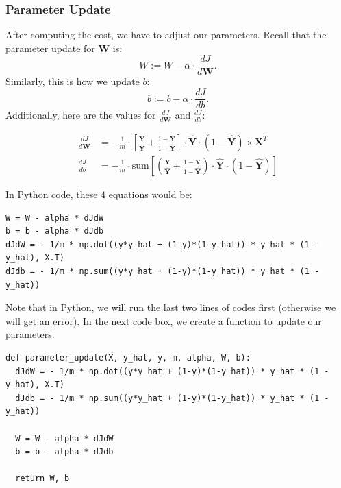 \documentclass{article}
\begin{document}
\subsubsection{Parameter Update}
After computing the cost, we have to adjust our parameters. Recall that the parameter update for $\textbf{W}$ is:
$$W:=W-\alpha\cdot \frac{dJ}{d\textbf{W}}.$$
Similarly, this is how we update $b$:
$$b:=b-\alpha\cdot \frac{dJ}{db}.$$
Additionally, here are the values for $\frac{dJ}{d\textbf{W}}$ and $\frac{dJ}{db}$:

\begin{align*}
\frac{dJ}{d\textbf{W}}&=-\frac{1}{m}\cdot \left[\frac{\textbf{Y}}{\hat{\textbf{Y}}}+\frac{1-\textbf{Y}}{1-\hat{\textbf{Y}}}\right]\cdot \hat{\textbf{Y}}\cdot (1-\hat{\textbf{Y}})\times \textbf{X}^T\\
\frac{dJ}{db}&=-\frac{1}{m}\cdot \text{sum}\left[\left(\frac{\textbf{Y}}{\hat{\textbf{Y}}}+\frac{1-\textbf{Y}}{1-\hat{\textbf{Y}}}\right)\cdot \hat{\textbf{Y}}\cdot (1-\hat{\textbf{Y}})\right]
\end{align*}

In Python code, these 4 equations would be:
\begin{lstlisting}
W = W - alpha * dJdW
b = b - alpha * dJdb
dJdW = - 1/m * np.dot((y*y_hat + (1-y)*(1-y_hat)) * y_hat * (1 - y_hat), X.T)
dJdb = - 1/m * np.sum((y*y_hat + (1-y)*(1-y_hat)) * y_hat * (1 - y_hat))
\end{lstlisting}
Note that in Python, we will run the last two lines of codes first (otherwise we will get an error). In the next code box, we create a function to update our parameters. 

\begin{lstlisting}
def parameter_update(X, y_hat, y, m, alpha, W, b):
  dJdW = - 1/m * np.dot((y*y_hat + (1-y)*(1-y_hat)) * y_hat * (1 - y_hat), X.T)
  dJdb = - 1/m * np.sum((y*y_hat + (1-y)*(1-y_hat)) * y_hat * (1 - y_hat))

  W = W - alpha * dJdW
  b = b - alpha * dJdb

  return W, b
\end{lstlisting}
\end{document}
